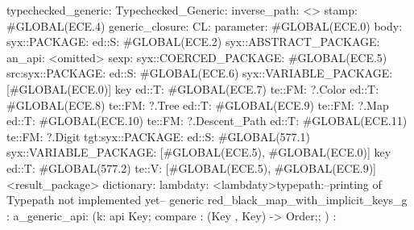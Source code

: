 typechecked_generic:
Typechecked_Generic:
inverse_path: <>
stamp: #GLOBAL(ECE.4)
generic_closure:
CL:
parameter: #GLOBAL(ECE.0)
body: syx::PACKAGE:
        ed::S: #GLOBAL(ECE.2)
            syx::ABSTRACT_PACKAGE:
                an_api: <omitted>
                sexp:
                    syx::COERCED_PACKAGE:
                        #GLOBAL(ECE.5)
                         src:syx::PACKAGE:
                                ed::S: #GLOBAL(ECE.6) syx::VARIABLE_PACKAGE: [#GLOBAL(ECE.0)] key
                                ed::T: #GLOBAL(ECE.7) te::FM: ?.Color
                                ed::T: #GLOBAL(ECE.8) te::FM: ?.Tree
                                ed::T: #GLOBAL(ECE.9) te::FM: ?.Map
                                ed::T: #GLOBAL(ECE.10) te::FM: ?.Descent_Path
                                ed::T: #GLOBAL(ECE.11) te::FM: ?.Digit
                        tgt:syx::PACKAGE:
                            ed::S: #GLOBAL(577.1)
                             syx::VARIABLE_PACKAGE:
                             [#GLOBAL(ECE.5), #GLOBAL(ECE.0)]
                             key
                            ed::T: #GLOBAL(577.2)
                             te::V:
                             [#GLOBAL(ECE.5), #GLOBAL(ECE.9)]
         <result_package>
dictionary:
lambdaty:
  <lambdaty>typepath:--printing of Typepath not implemented yet--
generic red_black_map_with_implicit_keys_g
:
a_generic_api:
(k:
api {
    Key;
    compare : (Key , Key) -> Order;};
)
:
